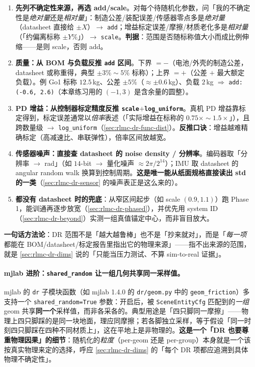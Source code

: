 \begin{enumerate}
  \item \textbf{先列不确定性来源，再选 add/scale}。对每个待随机化参数，问「我的不确定性是\emph{绝对量}还是\emph{相对量}」：制造公差/装配误差/传感器零点多是\emph{绝对量}（datasheet 直接给 $\pm X$）$\to$ \verb|add|；增益标定误差/摩擦/材质老化多是\emph{相对量}（「约偏离标称 $\pm Y\%$」）$\to$ \verb|scale|。\textbf{判据}：范围是否随标称值大小而成比例伸缩——是则 scale，否则 add。
  \item \textbf{质量：从 BOM 与负载反推 \texttt{add} 区间}。下界 $=-$（电池/外壳的制造公差，datasheet 或称重得，典型 $\pm 3\%\sim5\%$ 标称）；上界 $=+$（公差 $+$ 最大额定负载）。例 Go1 标称 $12.5$\,kg、公差 $\pm 5\%$（$\approx\pm 0.6$\,kg）、负载 $2$\,kg $\Rightarrow$ \verb|add: (-0.6, 2.6)|（本章练习用的 $(-1,3)$ 是含余量的圆整）。
  \item \textbf{PD 增益：从控制器标定精度反推 \texttt{scale}$+$\texttt{log\_uniform}}。真机 PD 增益靠标定得到，标定误差通常以\emph{倍率}表述（「实际增益在标称的 $0.75\times\sim1.5\times$」），且跨数量级 $\to$ \verb|log_uniform|（\cref{sec:rlmc-dr-func-dist}）。\textbf{反推口诀}：增益越难精确标定（高减速比、串联弹性），倍率区间放越宽。
  \item \textbf{传感器噪声：直接查 datasheet 的 noise density / 分辨率}。编码器取「分辨率 $\to$ rad」（如 $14$-bit $\to$ 量化噪声 $\approx 2\pi/2^{14}$）；IMU 取 datasheet 的 angular random walk 换算到控制周期。\textbf{这是唯一能从纸面规格直接读出 std 的一类}（\cref{sec:rlmc-dr-sensor} 的噪声表正是这么来的）。
  \item \textbf{都没有 datasheet 时的兜底}：从窄区间起步（如 scale $(0.9,1.1)$）跑 Phase 1，能训通再逐步放宽（\cref{sec:rlmc-dr-phased}），并优先用 system ID（\cref{sec:rlmc-dr-beyond}）实测一组真值锚定中心，而非盲目放大。
\end{enumerate}

\noindent{}\textbf{一句话方法论}：DR 范围不是「越大越鲁棒」也不是「抄来就对」，而是「\emph{每一项}都能在 BOM/datasheet/标定报告里指出它的物理来源」——指不出来源的范围，就是 \cref{sec:rlmc-dr-dims} 说的「只能当压力测试、不算 sim-to-real 证据」。

\paragraph{mjlab 进阶：\texttt{shared\_random} 让一组几何共享同一采样值。}mjlab 的 \verb|dr| 子模块函数（如 mjlab 1.4.0 的 \verb|dr/geom.py| 中的 \verb|geom_friction|）多支持一个 \verb|shared_random=True| 参数：开启后，被 \verb|SceneEntityCfg| 匹配到的\emph{一组} geom 共享\textbf{同一个}采样值，而非各采各的。典型用途是「四只脚同一摩擦」——物理上四只脚踩的是同一块地面，理应同摩擦；若各脚独立采样，等于假设「同一时刻四只脚踩在四种不同材质上」，这在平地上是非物理的。\textbf{这是一个「DR 也要尊重物理因果」的细节}：随机化的\emph{粒度}（per-geom 还是 per-group）本身就是一个该按真实物理来定的选择，呼应 \cref{sec:rlmc-dr-dims} 的「每个 DR 项都应追溯到具体物理不确定性」。

